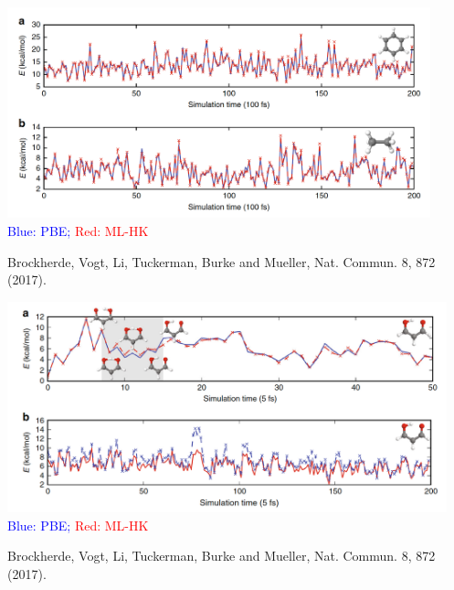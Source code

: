 \documentclass[handout]{beamer} %
\begin{document}
\begin{frame}
\begin{center}
\includegraphics[height=2.4in]{figures_ml/Mueller_benzene_ethane.png} \\
\textcolor{blue}{Blue: PBE;}  \textcolor{red}{Red: ML-HK}
\end{center}
\vspace{5mm}
\begin{center}
\footnotesize{Brockherde, Vogt, Li, Tuckerman, Burke and Mueller, Nat. Commun. 8, 872 (2017).} 

\end{center} 
\end{frame}

\begin{frame}
\begin{center}
\includegraphics[height=2.4in]{figures_ml/Mueller_malonaldehyde.png} \\
\textcolor{blue}{Blue: PBE;}  \textcolor{red}{Red: ML-HK}
\end{center}
\vspace{5mm}
\begin{center}
\footnotesize{Brockherde, Vogt, Li, Tuckerman, Burke and Mueller, Nat. Commun. 8, 872 (2017).}
\end{center} 
\end{frame}
\end{document}
